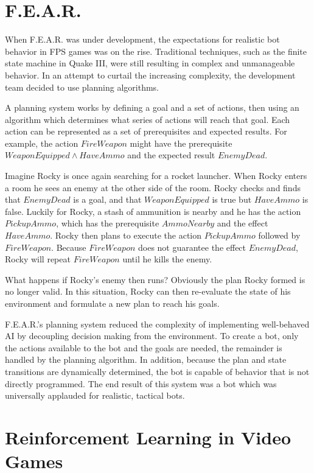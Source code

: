 \section{F.E.A.R.}

 When F.E.A.R. was under development, the expectations for realistic bot behavior in FPS games was on the rise. Traditional techniques, such as the finite state machine in Quake III, were still resulting in complex and unmanageable behavior. In an attempt to curtail the increasing complexity, the development team decided to use planning algorithms.

A planning system works by defining a goal and a set of actions, then using an algorithm which determines what series of actions will reach that goal. Each action can be represented as a set of prerequisites and expected results. For example, the action $FireWeapon$ might have the prerequisite $WeaponEquipped \land HaveAmmo$ and the expected result $EnemyDead$.

Imagine Rocky is once again searching for a rocket launcher. When Rocky enters a room he sees an enemy at the other side of the room. Rocky checks and finds that $EnemyDead$ is a goal, and that $WeaponEquipped$ is true but  $HaveAmmo$ is false. Luckily for Rocky, a stash of ammunition is nearby and he has the action $PickupAmmo$, which has the prerequisite $AmmoNearby$ and the effect $HaveAmmo$. Rocky then plans to execute the action $PickupAmmo$ followed by $FireWeapon$. Because $FireWeapon$ does not guarantee the effect $EnemyDead$, Rocky will repeat $FireWeapon$ until he kills the enemy.

What happens if Rocky's enemy then runs? Obviously the plan Rocky formed is no longer valid. In this situation, Rocky can then re-evaluate the state of his environment and formulate a new plan to reach his goals.

F.E.A.R.'s planning system reduced the complexity of implementing well-behaved AI by decoupling decision making from the environment. To create a bot, only the actions available to the bot and the goals are needed, the remainder is handled by the planning algorithm. In addition, because the plan and state transitions are dynamically determined, the bot is capable of behavior that is not directly programmed. The end result of this system was a bot which was universally applauded for realistic, tactical bots.

\section{Reinforcement Learning in Video Games}

